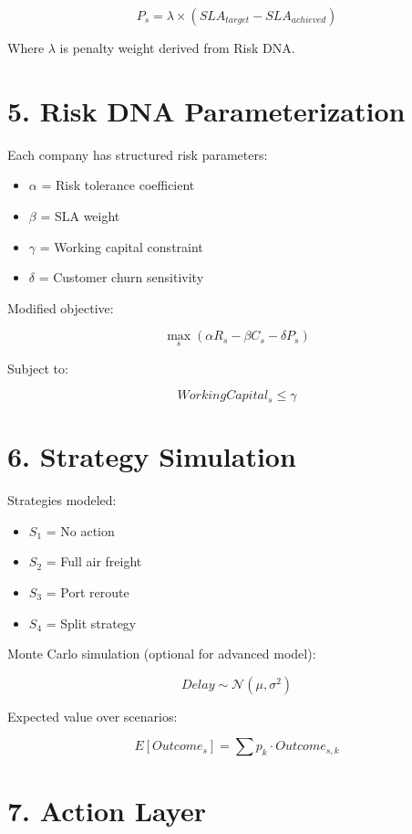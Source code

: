 \documentclass[11pt]{article}
\begin{document}
\[
P_s = \lambda \times (SLA_{target} - SLA_{achieved})
\]

Where $\lambda$ is penalty weight derived from Risk DNA.

\section*{5. Risk DNA Parameterization}

Each company has structured risk parameters:

\begin{itemize}
    \item $\alpha$ = Risk tolerance coefficient
    \item $\beta$ = SLA weight
    \item $\gamma$ = Working capital constraint
    \item $\delta$ = Customer churn sensitivity
\end{itemize}

Modified objective:

\[
\max_{s} \left( \alpha R_s - \beta C_s - \delta P_s \right)
\]

Subject to:

\[
WorkingCapital_s \leq \gamma
\]

\section*{6. Strategy Simulation}

Strategies modeled:

\begin{itemize}
    \item $S_1$ = No action
    \item $S_2$ = Full air freight
    \item $S_3$ = Port reroute
    \item $S_4$ = Split strategy
\end{itemize}

Monte Carlo simulation (optional for advanced model):

\[
Delay \sim \mathcal{N}(\mu, \sigma^2)
\]

Expected value over scenarios:

\[
E[Outcome_s] = \sum p_k \cdot Outcome_{s,k}
\]

\section*{7. Action Layer}
\end{document}
